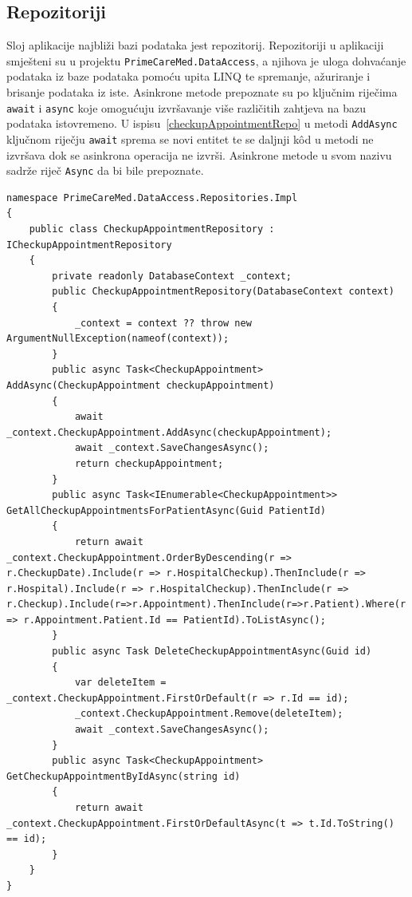 \subsection{Repozitoriji}
\label{subsec:repo}
Sloj aplikacije najbliži bazi podataka jest repozitorij. Repozitoriji u aplikaciji smješteni su u projektu \texttt{PrimeCareMed.DataAccess}, a njihova je uloga dohvaćanje podataka iz baze podataka pomoću upita LINQ te spremanje, ažuriranje i brisanje podataka iz iste\cite{linq}. Asinkrone metode prepoznate su po ključnim riječima \texttt{await} i \texttt{async} koje omogućuju izvršavanje više različitih zahtjeva na bazu podataka istovremeno. U ispisu~\ref{checkupAppointmentRepo} u metodi \texttt{AddAsync} ključnom riječju \texttt{await} sprema se novi entitet te se daljnji k\^od u metodi ne izvršava dok se asinkrona operacija ne izvrši. Asinkrone metode u svom nazivu sadrže riječ \texttt{Async} da bi bile prepoznate.

\begin{lstlisting}[caption={Repozitorij \texttt{CheckupAppointment}}, label=checkupAppointmentRepo]
namespace PrimeCareMed.DataAccess.Repositories.Impl
{
    public class CheckupAppointmentRepository : ICheckupAppointmentRepository
    {
        private readonly DatabaseContext _context;
        public CheckupAppointmentRepository(DatabaseContext context)
        {
            _context = context ?? throw new ArgumentNullException(nameof(context));
        }
        public async Task<CheckupAppointment> AddAsync(CheckupAppointment checkupAppointment)
        {
            await _context.CheckupAppointment.AddAsync(checkupAppointment);
            await _context.SaveChangesAsync();
            return checkupAppointment;
        }
        public async Task<IEnumerable<CheckupAppointment>> GetAllCheckupAppointmentsForPatientAsync(Guid PatientId)
        {
            return await _context.CheckupAppointment.OrderByDescending(r => r.CheckupDate).Include(r => r.HospitalCheckup).ThenInclude(r => r.Hospital).Include(r => r.HospitalCheckup).ThenInclude(r => r.Checkup).Include(r=>r.Appointment).ThenInclude(r=>r.Patient).Where(r => r.Appointment.Patient.Id == PatientId).ToListAsync();
        }
        public async Task DeleteCheckupAppointmentAsync(Guid id)
        {
            var deleteItem = _context.CheckupAppointment.FirstOrDefault(r => r.Id == id);
            _context.CheckupAppointment.Remove(deleteItem);
            await _context.SaveChangesAsync();
        }
        public async Task<CheckupAppointment> GetCheckupAppointmentByIdAsync(string id)
        {
            return await _context.CheckupAppointment.FirstOrDefaultAsync(t => t.Id.ToString() == id);
        }
    }
}
\end{lstlisting}

